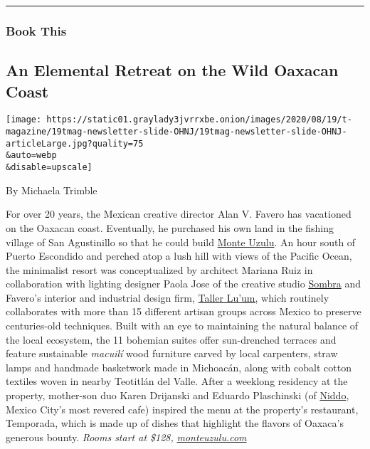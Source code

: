 \begin{center}\rule{0.5\linewidth}{\linethickness}\end{center}

\hypertarget{book-this}{%
\subsubsection{Book This}\label{book-this}}

\hypertarget{an-elemental-retreat-on-the-wild-oaxacan-coast}{%
\subsection{An Elemental Retreat on the Wild Oaxacan
Coast}\label{an-elemental-retreat-on-the-wild-oaxacan-coast}}

\texttt{[image: https://static01.graylady3jvrrxbe.onion/images/2020/08/19/t-magazine/19tmag-newsletter-slide-OHNJ/19tmag-newsletter-slide-OHNJ-articleLarge.jpg?quality=75\\\&auto=webp\\\&disable=upscale]}

By Michaela Trimble

For over 20 years, the Mexican creative director Alan V. Favero has
vacationed on the Oaxacan coast. Eventually, he purchased his own land
in the fishing village of San Agustinillo so that he could build
\href{https://www.monteuzulu.com/en/?campaign_id=0\&emc=edit_tmag_20200818\&instance_id=0\&nl=the-t-list\&regi_id=0\&segment_id=0\&te=1\&user_id=be464ca5f03720b0f126373c15a15dcc}{Monte
Uzulu}. An hour south of Puerto Escondido and perched atop a lush hill
with views of the Pacific Ocean, the minimalist resort was
conceptualized by architect Mariana Ruiz in collaboration with lighting
designer Paola Jose of the creative studio
\href{https://s-ombra.com/en/field-of-light}{Sombra} and Favero's
interior and industrial design firm,
\href{https://www.tallerluum.com.mx/?campaign_id=0\&emc=edit_tmag_20200818\&instance_id=0\&nl=the-t-list\&regi_id=0\&segment_id=0\&te=1\&user_id=be464ca5f03720b0f126373c15a15dcc}{Taller
Lu'um,} which routinely collaborates with more than 15 different artisan
groups across Mexico to preserve centuries-old techniques. Built with an
eye to maintaining the natural balance of the local ecosystem, the 11
bohemian suites offer sun-drenched terraces and feature sustainable
\emph{macuilí} wood furniture carved by local carpenters, straw lamps
and handmade basketwork made in Michoacán, along with cobalt cotton
textiles woven in nearby Teotitlán del Valle. After a weeklong residency
at the property, mother-son duo Karen Drijanski and Eduardo Plaschinski
(of
\href{https://niddo.mx/?campaign_id=0\&emc=edit_tmag_20200818\&instance_id=0\&nl=the-t-list\&regi_id=0\&segment_id=0\&te=1\&user_id=be464ca5f03720b0f126373c15a15dcc}{Niddo},
Mexico City's most revered cafe) inspired the menu at the property's
restaurant, Temporada, which is made up of dishes that highlight the
flavors of Oaxaca's generous bounty. \emph{Rooms start at \$128,}
\href{https://www.monteuzulu.com}{\emph{monteuzulu.com}}


